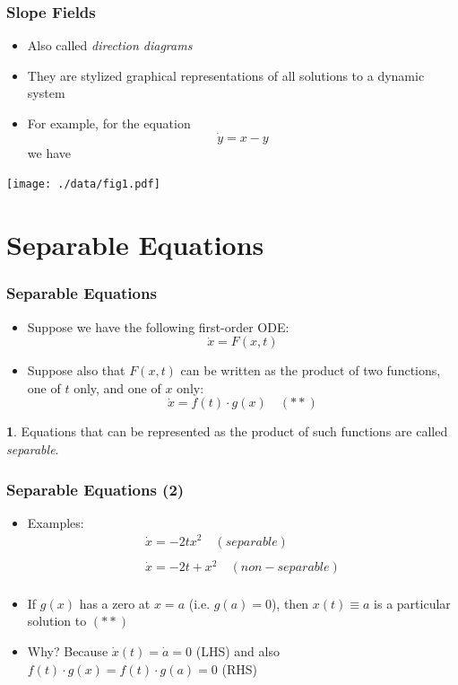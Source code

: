 \documentclass[10pt,usenames,dvipsnames]{beamer}
\theoremstyle{definition}
\newtheorem{definition}{\translate{Definition}}
\begin{document}
\begin{frame}[fragile]
\frametitle{Slope Fields}
\begin{itemize}
	\item Also called \textit{direction diagrams}
	\item They are stylized graphical representations of all solutions to a dynamic system
	\item For example, for the equation 
	\[
		\dot{y} = x - y 
	\]
	we have
\end{itemize}
\begin{center}
	\texttt{[image: ./data/fig1.pdf]}
\end{center}

\end{frame}

\section{Separable Equations}
\begin{frame}[fragile]
\frametitle{Separable Equations}
\begin{itemize}
	\item Suppose we have the following first-order ODE:
	\[
		\dot{x} = F(x,t) 
	\]
	\item Suppose also that $F(x,t)$ can be written as the product of two functions, one of $t$ only, and one of $x$ only:
	\[
		\dot{x} = f(t)\cdot g(x)\quad (**)
	\]
\end{itemize}

\begin{definition}
	Equations that can be represented as the product of such functions are called \textit{separable}.
\end{definition}
\end{frame}

\begin{frame}[fragile]
\frametitle{Separable Equations (2)}
\begin{itemize}
	\item Examples:
	\[
		\begin{array}{lcl}
			\dot{x} = -2tx^{2}\quad (separable)\\
			\quad\\
			\dot{x} = -2t + x^{2}\quad (non-separable)\\
		\end{array}
	\]
	\item If $g(x)$ has a zero at $x = a$ (i.e. $g(a) = 0$), then $x(t) \equiv a$ is a particular solution to $(**)$
	\item Why? Because $\dot{x}(t) = \dot{a} = 0$ (LHS) and also $f(t)\cdot g(x) = f(t)\cdot g(a) = 0$ (RHS)
\end{itemize}
\end{frame}
\end{document}

